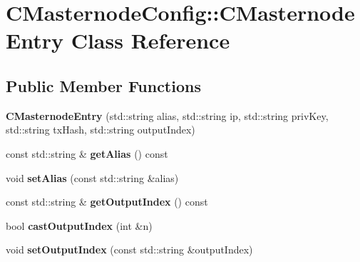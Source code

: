 \hypertarget{class_c_masternode_config_1_1_c_masternode_entry}{}\section{C\+Masternode\+Config\+::C\+Masternode\+Entry Class Reference}
\label{class_c_masternode_config_1_1_c_masternode_entry}
\subsection*{Public Member Functions}
\begin{DoxyCompactItemize}
\item 
\mbox{\label{class_c_masternode_config_1_1_c_masternode_entry_aa393b13586ba87b366559052980bf884}} 
{\bfseries C\+Masternode\+Entry} (std\+::string alias, std\+::string ip, std\+::string priv\+Key, std\+::string tx\+Hash, std\+::string output\+Index)
\item 
\mbox{\label{class_c_masternode_config_1_1_c_masternode_entry_abf242505d9955e37da0628a35d26677e}} 
const std\+::string \& {\bfseries get\+Alias} () const
\item 
\mbox{\label{class_c_masternode_config_1_1_c_masternode_entry_aa74db50dc25069a288266e22867b4537}} 
void {\bfseries set\+Alias} (const std\+::string \&alias)
\item 
\mbox{\label{class_c_masternode_config_1_1_c_masternode_entry_a4aff6625aebbc697706d13fdf044cafa}} 
const std\+::string \& {\bfseries get\+Output\+Index} () const
\item 
\mbox{\label{class_c_masternode_config_1_1_c_masternode_entry_a2b6bd533a4a01a1fc486858f8c3856c5}} 
bool {\bfseries cast\+Output\+Index} (int \&n)
\item 
\mbox{\label{class_c_masternode_config_1_1_c_masternode_entry_a0f4523fe58c95398c9b4cac773a5f39c}} 
void {\bfseries set\+Output\+Index} (const std\+::string \&output\+Index)
\item 

\end{DoxyCompactItemize}

